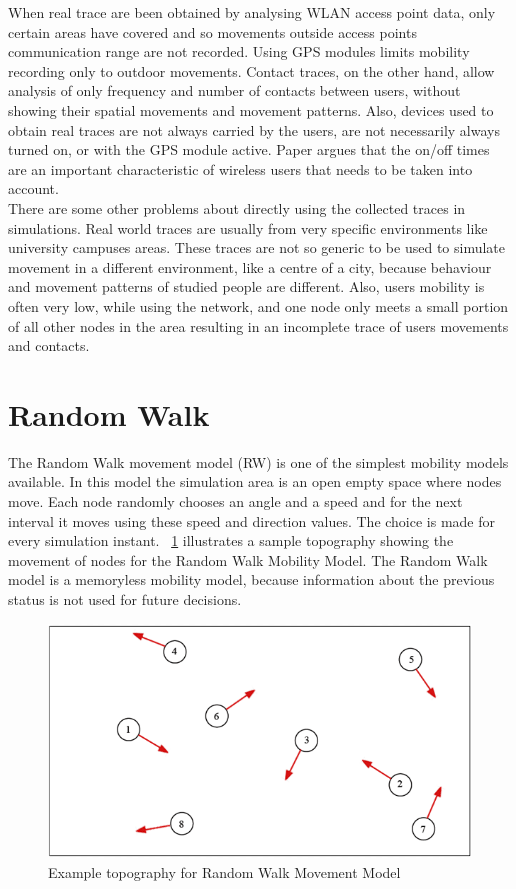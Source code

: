 When real trace are been obtained by analysing WLAN access point data, only certain areas have covered and so movements outside access points communication range are not recorded. Using GPS modules limits mobility recording only to outdoor movements. Contact traces, on the other hand, allow analysis of only frequency and number of contacts between users, without showing their spatial movements and movement patterns. Also, devices used to obtain real traces are not always carried by the users, are not necessarily always turned on, or with the GPS module active. Paper \cite{ImpactofHumanMobility} argues that the on/off times are an important characteristic of wireless users that needs to be taken into account.
\\

There are some other problems about directly using the collected traces in simulations. Real world traces are usually from very specific environments like university campuses areas. These traces are not so generic to be used to simulate movement in a different environment, like a centre of a city, because behaviour and movement patterns of studied people are different. Also, users mobility is often very low, while using the network, and one node only meets a small portion of all other nodes in the area resulting in an incomplete trace of users movements and contacts.
\\


\section{Random Walk}
The Random Walk movement model (RW) is one of the simplest mobility models available. In this model the simulation area is an open empty space where nodes move. Each node randomly chooses an angle and a speed and for the next interval it moves using these speed and direction values. The choice is made for every simulation instant. \figurename~\ref{fig:random_walk} illustrates a sample topography showing the movement of nodes for the Random Walk Mobility Model. The Random Walk model is a memoryless mobility model, because information about the previous status is not used for future decisions. 
\begin{figure}[htpb]
  \begin{center}
    \includegraphics[scale=0.6]{4-movimento/img/random_walk.png}
    \caption{Example topography for Random Walk Movement Model}    
    \label{fig:random_walk}
  \end{center}
\end{figure}

